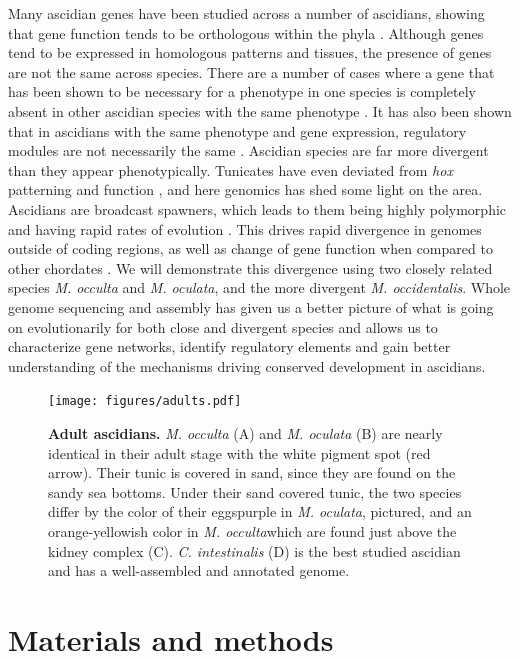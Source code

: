 Many ascidian genes have been studied across a number of ascidians, showing that gene function tends to be orthologous within the phyla \cite{satoh_ascidian_2003}. Although genes tend to be expressed in homologous patterns and tissues, the presence of genes are not the same across species. There are a number of cases where a gene that has been shown to be necessary for a phenotype in one species is completely absent in other ascidian species with the same phenotype \cite{lemaire_ascidians_2008}. It has also been shown that in ascidians with the same phenotype and gene expression, regulatory modules are not necessarily the same \cite{hudson_divergent_2011,kugler_evolutionary_2011,stolfi_divergent_2014}. Ascidian species are far more divergent than they appear phenotypically. Tunicates have even deviated from \textit{hox} patterning and function \cite{ikuta_limited_2010}, and here genomics has shed some light on the area. Ascidians are broadcast spawners, which leads to them being highly polymorphic and having rapid rates of evolution \cite{dehal_draft_2002}. This drives rapid divergence in genomes outside of coding regions, as well as change of gene function when compared to other chordates \cite{lemaire_ascidians_2008}. We will demonstrate this divergence using two closely related species \textit{M. occulta} and \textit{M. oculata}, and the more divergent \textit{M. occidentalis}. Whole genome sequencing and assembly has given us a better picture of what is going on evolutionarily for both close and divergent species and allows us to characterize gene networks, identify regulatory elements and gain better understanding of the mechanisms driving conserved development in ascidians.

\begin{figure}[tbp]
\centering
\texttt{[image: figures/adults.pdf]}
\caption{\textbf{Adult ascidians.} \textit{M. occulta} (A) and \textit{M. oculata} (B) are nearly identical in their adult stage with the white pigment spot (red arrow). Their tunic is covered in sand, since they are found on the sandy sea bottoms. Under their sand covered tunic, the two species differ by the color of their eggs\textemdash purple in \textit{M. oculata}, pictured, and an orange-yellowish color in \textit{M. occulta}\textemdash which are found just above the kidney complex (C). \textit{C. intestinalis} (D) is the best studied ascidian and has a well-assembled and annotated genome.}
\label{fig:adults}
\end{figure}

\section{Materials and methods}

